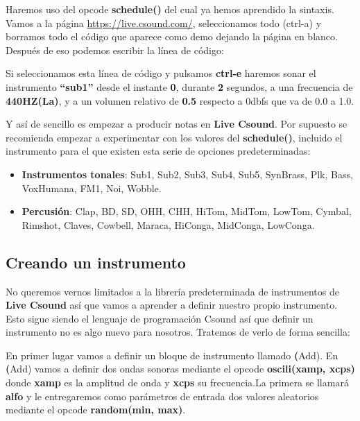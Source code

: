Haremos uso del opcode \textbf{schedule()} del cual ya hemos aprendido la sintaxis.
Vamos a la página \url{https://live.csound.com/}, seleccionamos todo (ctrl-a) y borramos todo el código que aparece como demo dejando la página en blanco. Después de eso podemos escribir la línea de código:

 
 Si seleccionamos esta línea de código y pulsamos \textbf{ctrl-e} haremos sonar el instrumento \textbf{``sub1''} desde el instante \textbf{0}, durante \textbf{2} segundos, a una frecuencia de \textbf{440HZ(La)}, y a un volumen relativo de \textbf{0.5} respecto a 0dbfs que va de 0.0 a 1.0.
 
 Y así de sencillo es empezar a producir notas en \textbf{Live Csound}. Por supuesto se recomienda empezar a experimentar con los valores del \textbf{schedule()}, incluido el instrumento para el que existen esta serie de opciones predeterminadas:
 
 \begin{itemize}
 \item \textbf{Instrumentos tonales}: Sub1, Sub2, Sub3, Sub4, Sub5, SynBrass, Plk, Bass, VoxHumana, FM1, Noi, Wobble.
 \item \textbf{Percusión}: Clap, BD, SD, OHH, CHH, HiTom, MidTom, LowTom, Cymbal, Rimshot, Claves, Cowbell, Maraca, HiConga, MidConga, LowConga.
\end{itemize}
 
\subsection{Creando un instrumento}

No queremos vernos limitados a la librería predeterminada de instrumentos de \textbf{Live Csound} así que vamos a aprender a definir nuestro propio instrumento. Esto sigue siendo el lenguaje de programación Csound así que definir un instrumento no es algo nuevo para nosotros. Tratemos de verlo de forma sencilla:

 
En primer lugar vamos a definir un bloque de instrumento llamado \textbf(Add). En \textbf(Add) vamos a definir dos ondas sonoras mediante el opcode \textbf{oscili(xamp, xcps)} donde \textbf{xamp} es la amplitud de onda y \textbf{xcps} su frecuencia.La primera se llamará \textbf{alfo} y le entregaremos como parámetros de entrada dos valores aleatorios mediante el opcode \textbf{random(min, max)}. 

